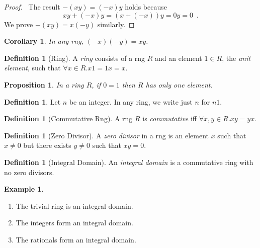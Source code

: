 \documentclass{article}
\let\qed\relax
\newtheorem{proposition}[axiom]{Proposition}
\newtheorem{corollary}{Corollary}[axiom]
\theoremstyle{definition}
\newtheorem{definition}[axiom]{Definition}
\newtheorem{example}[axiom]{Example}
\begin{document}
    \begin{proof}
        \pf\ The result $-(xy) = (-x)y$ holds because
        \[ xy + (-x)y = (x+(-x))y = 0y = 0 \enspace . \]
        We prove $-(xy) = x(-y)$ similarly. \qed
    \end{proof}

    \begin{corollary}
        In any rng, $(-x)(-y) = xy$.
    \end{corollary}

    \begin{definition}[Ring]
        A \emph{ring} consists of a rng $R$ and an element $1 \in R$, the \emph{unit element},
        such that $\forall x \in R. x1 = 1x = x$.
    \end{definition}

    \begin{proposition}
        In a ring $R$, if $0 = 1$ then $R$ has only one element.
    \end{proposition}

    \begin{definition}
        Let $n$ be an integer. In any ring, we write just $n$ for $n1$.
    \end{definition}

    \begin{definition}[Commutative Rng]
        A rng $R$ is \emph{commutative} iff $\forall x,y \in R. xy = yx$.
    \end{definition}

    \begin{definition}[Zero Divisor]
        A \emph{zero divisor} in a rng is an element $x$ such that $x \neq 0$ but there exists $y \neq 0$ such
        that $xy = 0$.
    \end{definition}

    \begin{definition}[Integral Domain]
        An \emph{integral domain} is a commutative ring with no zero divisors.
    \end{definition}

    \begin{example}
        \begin{enumerate}
            \item The trivial ring is an integral domain.
            \item The integers form an integral domain.
            \item The rationals form an integral domain.
        \end{enumerate}
    \end{example}
\end{document}

